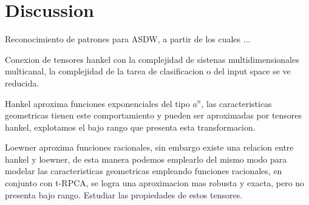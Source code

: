 \documentclass[sensors,article,submit,moreauthors,pdftex]{Definitions/mdpi}
\begin{document}

%

\section{Discussion}

Reconocimiento de patrones para ASDW, a partir de los cuales ...

Conexion de tensores hankel con la complejidad de sistenas multidimensionales multicanal, la complejidad de la tarea de clasificacion o del input space se ve reducida.

Hankel aproxima funciones exponenciales del tipo $a^n$, las caracteristicas geometricas tienen este comportamiento y pueden ser aproximadas por tensores hankel, explotamos el bajo rango que presenta esta transformacion.

Loewner aproxima funciones racionales, sin embargo existe una relacion entre hankel y loewner, de esta manera podemos emplearlo del mismo modo para modelar las caracteristicas geometricas empleando funciones racionales, en conjunto con t-RPCA, se logra una aproximacion mas robusta y exacta, pero no presenta bajo rango. Estudiar las propiedades de estos tensores.

\end{document}
